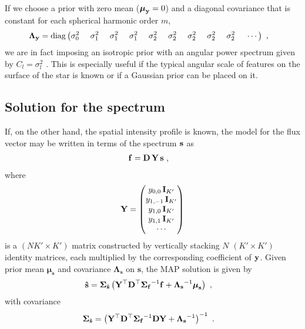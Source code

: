 \documentclass[modern]{aastex631}
\begin{document}
%
If we choose a prior with zero mean ($\boldsymbol{\mu}_{\mathbf{y}} = 0$)
and a diagonal covariance that is constant for each spherical harmonic order $m$,
%
\begin{align}
    \boldsymbol{\Lambda}_\bvec{y} & =
    \mathrm{diag} \left(
    \sigma_0^2
    \quad\quad\quad\quad
    \sigma_1^2
    \quad\quad\quad\quad
    \sigma_1^2
    \quad\quad\quad\quad
    \sigma_1^2
    \quad\quad\quad\quad
    \sigma_2^2
    \quad\quad\quad\quad
    \sigma_2^2
    \quad\quad\quad\quad
    \sigma_2^2
    \quad\quad\quad\quad
    \sigma_2^2
    \quad\quad\quad\quad
    \sigma_2^2
    \quad\quad\quad\quad
    \cdots
    \right)
    \quad,
\end{align}
%
we are in fact imposing an isotropic prior with an angular power spectrum given by $C_l = \sigma_l^2$
\citep[e.g.,][]{Baldi2006}. 
This is especially useful if the typical angular scale of features on the surface of the star is known or if a Gaussian prior can be placed on it.

\subsection{Solution for the spectrum}
\label{sec:solve_s}
%
If, on the other hand, the spatial intensity profile is known, the model for the flux vector may be written in terms of the spectrum ${\mathbf{s}}$ as
%
\begin{align}
    \label{eq:inverse:fs}
    {\ensuremath{\mathbf{f}}}
     & =
    {\mathbf{D}}
    \,
    {\mathbf{Y}}
    \,
    {\mathbf{s}}
    \hskip 0.33em,
\end{align}
%
where
%
\begin{align}
    \label{eq:inverse:Y}
    {\ensuremath{\mathbf{Y}}} =
    \begin{pmatrix}
        y_{0,0}\, {\mathbf{I}}_{K'} \\
        y_{1,-1}\, {\mathbf{I}}_{K'} \\
        y_{1,0}\, {\mathbf{I}}_{K'} \\
        y_{1,1}\, {\mathbf{I}}_{K'} \\
        \cdots
    \end{pmatrix}
\end{align}
%
is a $(NK' \times K')$ matrix constructed by vertically stacking $N$ $(K' \times K')$ identity matrices, each multiplied by the corresponding coefficient of ${\mathbf{y}}$. 
Given prior mean $\boldsymbol{\mu}_\mathbf{s}$ and covariance $\boldsymbol{\Lambda}_\mathbf{s}$ on $\mathbf{s}$, the MAP solution is given by
%
\begin{align}
    \label{eq:inverse:shat}
    {\ensuremath{\mathbf{\hat{s}}}} & =
    \boldsymbol{\Sigma}_\mathbf{\hat{s}}
    \left(
    {\mathbf{Y}}^\top{\ensuremath{\mathbf{D}}}^\top
    {\boldsymbol{\Sigma}_\mathbf{f}}^{-1}
    {\mathbf{f}}
    +
    {\boldsymbol{\Lambda}_\mathbf{s}}^{-1} \boldsymbol{\mu}_\mathbf{s}
    \right)
    \hskip 0.33em,
\end{align}
%
with covariance
%
\begin{align}
    \label{eq:inverse:scov}
    \boldsymbol{\Sigma}_\mathbf{\hat{s}} & =
    \left(
    {\mathbf{Y}}^\top{\ensuremath{\mathbf{D}}}^\top
    {\boldsymbol{\Sigma}_\mathbf{f}}^{-1}
    {\mathbf{D}}{\mathbf{Y}}
    +
    {\boldsymbol{\Lambda}_\mathbf{s}}^{-1}
    \right)^{-1}
    \hskip 0.33em.
\end{align}
\end{document}
